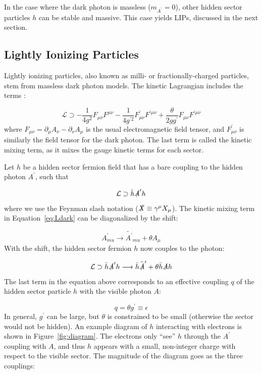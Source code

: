 In the case where the dark photon is massless ($m_{A^{\prime}} = 0$), other hidden sector particles $h$ can be stable and massive. This case yields \ac{LIP}s, discussed in the next section.

\subsection{Lightly Ionizing Particles}
Lightly ionizing particles, also known as milli- or fractionally-charged particles, stem from massless dark photon models. The kinetic Lagrangian includes the terms \cite{Holdom1986} \cite{Abel2008}:

\begin{equation}
\label{eq:Ldark}
\mathcal{L} \supset -\frac{1}{4g^{2}}F_{\mu\nu}F^{\mu\nu} - \frac{1}{4g^{\prime2}}F^{\prime}_{\mu\nu}F^{\prime \mu\nu} + \frac{\theta}{2gg^{\prime}} F_{\mu\nu}F^{\prime \mu\nu}
\end{equation}
where $F_{\mu\nu} = \partial_{\mu}A_{\nu} - \partial_{\nu}A_{\mu}$ is the usual electromagnetic field tensor, and $F^{\prime}_{\mu\nu}$ is similarly the field tensor for the dark photon. The last term is called the kinetic mixing term, as it mixes the gauge kinetic terms for each sector. 

Let $h$ be a hidden sector fermion field that has a bare coupling to the hidden photon $A^{\prime}$, such that

\begin{equation}
\mathcal{L} \supset \bar{h}\slashed{A}^{\prime} h 
\end{equation}
where we use the Feynman slash notation ($\slashed{X} \equiv \gamma^{\mu}X_{\mu}$). The kinetic mixing term in Equation~\ref{eq:Ldark} can be diagonalized by the shift:

\begin{equation}
A^{\prime}_{mu} \longrightarrow \tilde{A^{\prime}}_{mu} + \theta A_{\mu}
\end{equation}
With the shift, the hidden sector fermion $h$ now couples to the photon:

\begin{equation}
\mathcal{L} \supset \bar{h}\slashed{A}^{\prime} h \longrightarrow  \bar{h}\tilde{\slashed{A}}^{\prime} + \theta \bar{h} \slashed{A} h
\end{equation}
The last term in the equation above corresponds to an effective coupling $q$ of the hidden sector particle $h$ with the visible photon $A$: 

\begin{equation}
q = \theta g^{\prime} \equiv \epsilon
\end{equation}
In general, $g^{\prime}$ can be large, but $\theta$ is constrained to be small (otherwise the sector would not be hidden). An example diagram of $h$ interacting with electrons is shown in Figure~\ref{fig:diagram}. The electrons only ``see'' $h$ through the $A^{\prime}$ coupling with $A$, and thus $h$ appears with a small, non-integer charge with respect to the visible sector. The magnitude of the diagram goes as the three couplings:

